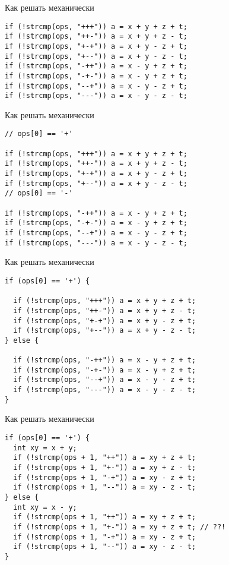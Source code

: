 \begin{frame}[t,fragile]{Как решать механически}
\begin{verbatim}
if (!strcmp(ops, "+++")) a = x + y + z + t;
if (!strcmp(ops, "++-")) a = x + y + z - t;
if (!strcmp(ops, "+-+")) a = x + y - z + t;
if (!strcmp(ops, "+--")) a = x + y - z - t;
if (!strcmp(ops, "-++")) a = x - y + z + t;
if (!strcmp(ops, "-+-")) a = x - y + z + t;
if (!strcmp(ops, "--+")) a = x - y - z + t;
if (!strcmp(ops, "---")) a = x - y - z - t;
\end{verbatim}
\end{frame}

\begin{frame}[t,fragile]{Как решать механически}
\begin{verbatim}
// ops[0] == '+'

if (!strcmp(ops, "+++")) a = x + y + z + t;
if (!strcmp(ops, "++-")) a = x + y + z - t;
if (!strcmp(ops, "+-+")) a = x + y - z + t;
if (!strcmp(ops, "+--")) a = x + y - z - t;
// ops[0] == '-'

if (!strcmp(ops, "-++")) a = x - y + z + t;
if (!strcmp(ops, "-+-")) a = x - y + z + t;
if (!strcmp(ops, "--+")) a = x - y - z + t;
if (!strcmp(ops, "---")) a = x - y - z - t;
\end{verbatim}
\end{frame}

\begin{frame}[t,fragile]{Как решать механически}
\begin{verbatim}
if (ops[0] == '+') {

  if (!strcmp(ops, "+++")) a = x + y + z + t;
  if (!strcmp(ops, "++-")) a = x + y + z - t;
  if (!strcmp(ops, "+-+")) a = x + y - z + t;
  if (!strcmp(ops, "+--")) a = x + y - z - t;
} else { 

  if (!strcmp(ops, "-++")) a = x - y + z + t;
  if (!strcmp(ops, "-+-")) a = x - y + z + t;
  if (!strcmp(ops, "--+")) a = x - y - z + t;
  if (!strcmp(ops, "---")) a = x - y - z - t;
}
\end{verbatim}
\end{frame}

\begin{frame}[t,fragile]{Как решать механически}
\begin{verbatim}
if (ops[0] == '+') {
  int xy = x + y;
  if (!strcmp(ops + 1, "++")) a = xy + z + t;
  if (!strcmp(ops + 1, "+-")) a = xy + z - t;
  if (!strcmp(ops + 1, "-+")) a = xy - z + t;
  if (!strcmp(ops + 1, "--")) a = xy - z - t;
} else { 
  int xy = x - y;
  if (!strcmp(ops + 1, "++")) a = xy + z + t;
  if (!strcmp(ops + 1, "+-")) a = xy + z + t; // ??!
  if (!strcmp(ops + 1, "-+")) a = xy - z + t;
  if (!strcmp(ops + 1, "--")) a = xy - z - t;
}
\end{verbatim}
\end{frame}

